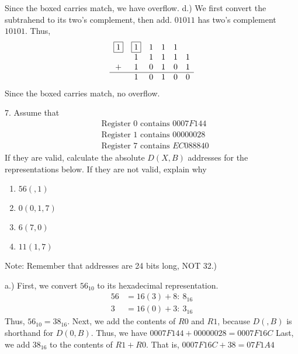 \documentclass{report}
\begin{document}
    Since the boxed carries match, we have overflow.
    \bigbreak \noindent 
    d.) We first convert the subtrahend to its two's complement, then add. $01011$ has two's complement $10101$. Thus,
    \begin{align*}
        \begin{array}{cccccc}
            \boxed{1}&\boxed{1}&1&1&1& \\
             &1&1&1&1&1 \\
            +&1&0&1&0&1 \\
            \hline
             &1&0&1&0&0
        \end{array}
    \end{align*}
    \bigbreak \noindent 
    Since the boxed carries match, no overflow.

    \pagebreak \bigbreak \noindent 
    \begin{mdframed}
        7. Assume that
        \begin{align*}
            &\text{Register 0 contains $0007F144$} \\
            &\text{Register 1 contains $00000028$} \\
            &\text{Register 7 contains $EC088840$}
        \end{align*}
        If they are valid, calculate the absolute $D(X,B)$ addresses for the representations below.  If they are not valid, explain why
        \begin{enumerate}[label=(\alph*)]
            \item $56(,1)$
            \item $0(0,1,7)$
            \item $6(7,0)$
            \item $11(1,7)$
        \end{enumerate}
        Note: Remember that addresses are 24 bits long, NOT 32.)
    \end{mdframed}
    \bigbreak \noindent 
    a.) First, we convert $56_{10}$ to its hexadecimal representation.
    \begin{align*}
        56 &= 16(3) + 8:\ 8_{16} \\
        3 &= 16(0) + 3:\ 3_{16}
    \end{align*}
    Thus, $56_{10} = 38_{16}$. Next, we add the contents of $R0$ and $R1$, because $D(,B)$ is shorthand for $D(0,B)$. Thus, we have $0007F144 + 00000028 = 0007F16C$
    \bigbreak \noindent 
    Last, we add $38_{16}$ to the contents of $R1 + R0$. That is, $0007F16C + 38 = 07F1A4$
    \bigbreak \noindent 
\end{document}

